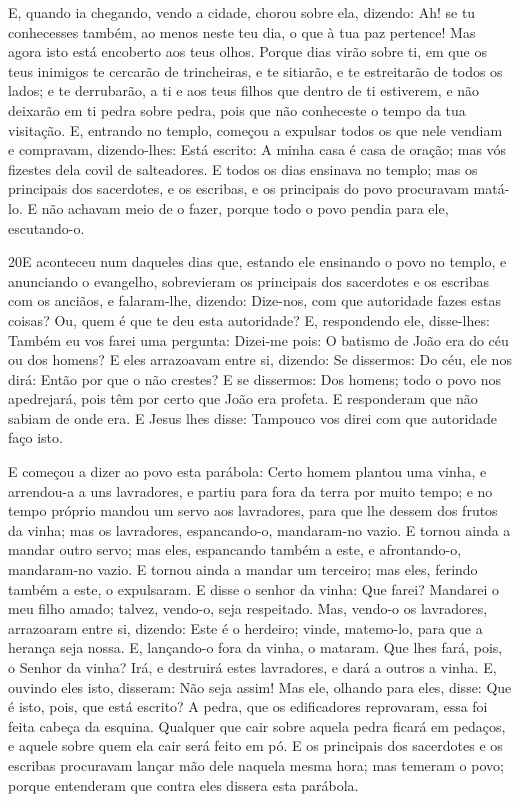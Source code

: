 E, quando ia chegando, vendo a cidade, chorou sobre ela,
dizendo: Ah! se tu conhecesses também, ao menos neste teu
dia, o que à tua paz pertence! Mas agora isto está encoberto aos
teus olhos. Porque dias virão sobre ti, em que os teus
inimigos te cercarão de trincheiras, e te sitiarão, e te estreitarão
de todos os lados; e te derrubarão, a ti e aos teus filhos
que dentro de ti estiverem, e não deixarão em ti pedra sobre pedra,
pois que não conheceste o tempo da tua visitação. E, entrando
no templo, começou a expulsar todos os que nele vendiam e compravam,
dizendo-lhes: Está escrito: A minha casa é casa de oração;
mas vós fizestes dela covil de salteadores. E todos os dias
ensinava no templo; mas os principais dos sacerdotes, e os escribas,
e os principais do povo procuravam matá-lo. E não achavam
meio de o fazer, porque todo o povo pendia para ele, escutando-o.

\medskip

\lettrine{20} E aconteceu num daqueles dias que, estando ele
ensinando o povo no templo, e anunciando o evangelho, sobrevieram os
principais dos sacerdotes e os escribas com os anciãos, e
falaram-lhe, dizendo: Dize-nos, com que autoridade fazes estas
coisas? Ou, quem é que te deu esta autoridade? E, respondendo
ele, disse-lhes: Também eu vos farei uma pergunta: Dizei-me pois:
O batismo de João era do céu ou dos homens? E eles
arrazoavam entre si, dizendo: Se dissermos: Do céu, ele nos dirá:
Então por que o não crestes? E se dissermos: Dos homens; todo o
povo nos apedrejará, pois têm por certo que João era profeta. E
responderam que não sabiam de onde era. E Jesus lhes disse:
Tampouco vos direi com que autoridade faço isto.

E começou a dizer ao povo esta parábola: Certo homem plantou uma
vinha, e arrendou-a a uns lavradores, e partiu para fora da terra
por muito tempo; e no tempo próprio mandou um servo aos
lavradores, para que lhe dessem dos frutos da vinha; mas os
lavradores, espancando-o, mandaram-no vazio. E tornou ainda a
mandar outro servo; mas eles, espancando também a este, e
afrontando-o, mandaram-no vazio. E tornou ainda a mandar um
terceiro; mas eles, ferindo também a este, o expulsaram. E
disse o senhor da vinha: Que farei? Mandarei o meu filho amado;
talvez, vendo-o, seja respeitado. Mas, vendo-o os lavradores,
arrazoaram entre si, dizendo: Este é o herdeiro; vinde, matemo-lo,
para que a herança seja nossa. E, lançando-o fora da vinha, o
mataram. Que lhes fará, pois, o Senhor da vinha? Irá, e
destruirá estes lavradores, e dará a outros a vinha. E, ouvindo eles
isto, disseram: Não seja assim! Mas ele, olhando para eles,
disse: Que é isto, pois, que está escrito? A pedra, que os
edificadores reprovaram, essa foi feita cabeça da esquina.
Qualquer que cair sobre aquela pedra ficará em pedaços, e
aquele sobre quem ela cair será feito em pó. E os principais
dos sacerdotes e os escribas procuravam lançar mão dele naquela
mesma hora; mas temeram o povo; porque entenderam que contra eles
dissera esta parábola.

